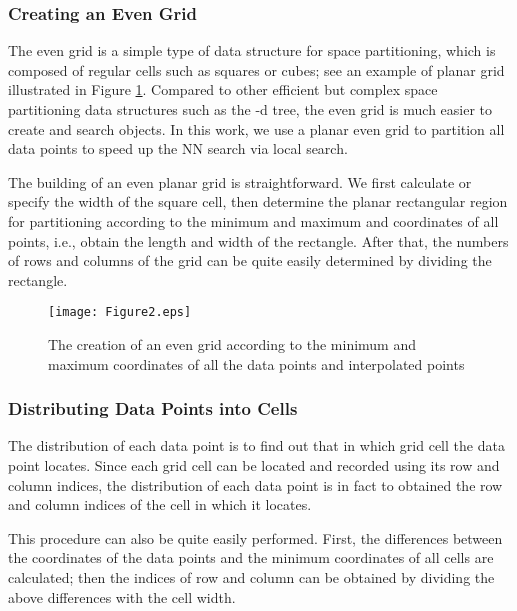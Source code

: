 \documentclass[final,5p,times,twocolumn,authoryear]{elsarticle}
\begin{document}
			\subsubsection{Creating an Even Grid}
			
			The even grid is a simple type of data structure for space partitioning, 
			which is composed of regular cells such as squares or cubes; see an example of 
			planar grid illustrated in Figure \ref{fig2}. Compared to other efficient but complex 
			space partitioning data structures such as the -d tree, the even grid is 
			much easier to create and search objects. In this work, we use a planar even 
			grid to partition all data points to speed up the NN search via local 
			search.
			
			The building of an even planar grid is straightforward. We first calculate 
			or specify the width of the square cell, then determine the planar 
			rectangular region for partitioning according to the minimum and maximum  
			and  coordinates of all points, i.e., obtain the length and width of the 
			rectangle. After that, the numbers of rows and columns of the grid can be 
			quite easily determined by dividing the rectangle.
			
			\begin{figure}[ht]
							\centering
							\texttt{[image: Figure2.eps]}
							\caption{The creation of an even grid according to the minimum and maximum coordinates of all the data points and interpolated points}
							\label{fig2}
						\end{figure}
			
			\subsubsection{Distributing Data Points into Cells}
			
			The distribution of each data point is to find out that in which grid cell 
			the data point locates. Since each grid cell can be located and recorded 
			using its row and column indices, the distribution of each data point is in 
			fact to obtained the row and column indices of the cell in which it locates. 
			
			This procedure can also be quite easily performed. First, the differences 
			between the coordinates of the data points and the minimum coordinates of 
			all cells are calculated; then the indices of row and column can be obtained 
			by dividing the above differences with the cell width.
			
\end{document}
